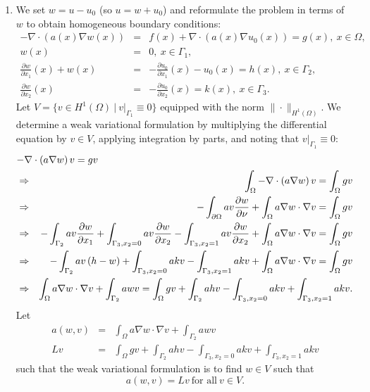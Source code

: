 \documentclass{article}
\begin{document}
\begin{enumerate}
\begin{enumerate}
\item We set \(w = u - u_0\) (so \(u = w + u_0\)) and reformulate the problem in terms of \(w\) to obtain homogeneous boundary conditions:
\begin{eqnarray*}
-\nabla \cdot (a(x) \nabla w(x)) & = & f(x) + \nabla \cdot (a(x) \nabla u_0(x)) = g(x), \ x \in \Omega, \\
w(x) & = & 0, \ x \in \Gamma_1, \\
\frac{\partial w}{\partial x_1}(x) + w(x) & = & -\frac{\partial u_0}{\partial x_1}(x) - u_0(x) = h(x), \ x \in \Gamma_2, \\
\frac{\partial w}{\partial x_2}(x) & = & -\frac{\partial u_0}{\partial x_2}(x) = k(x), \ x \in \Gamma_3.
\end{eqnarray*}
Let \(V = \{v \in H^1(\Omega) \ | \ v|_{\Gamma_1} \equiv 0\}\) equipped with the norm \(\|\cdot\|_{H^1(\Omega)}\).  We determine a weak variational formulation by multiplying the differential equation by \(v \in V\), applying integration by parts, and noting that \(v|_{\Gamma_1} \equiv 0\):
\begin{eqnarray*}
\lefteqn{-\nabla \cdot \left( a \nabla w \right) v = g v} \\
& \Rightarrow & \int_{\Omega} -\nabla \cdot \left( a \nabla w \right) v = \int_{\Omega} g v \\
& \Rightarrow & -\int_{\partial\Omega} a v \frac{\partial w}{\partial \nu} + \int_{\Omega} a \nabla w \cdot \nabla v = \int_{\Omega} g v \\
& \Rightarrow & -\int_{\Gamma_2} a v \frac{\partial w}{\partial x_1} + \int_{\Gamma_3, x_2 = 0} a v \frac{\partial w}{\partial x_2} - \int_{\Gamma_3, x_2 = 1} a v \frac{\partial w}{\partial x_2} + \int_{\Omega} a \nabla w \cdot \nabla v = \int_{\Omega} g v \\
& \Rightarrow & -\int_{\Gamma_2} a v \left( h - w \right) + \int_{\Gamma_3, x_2 = 0} a k v - \int_{\Gamma_3, x_2 = 1} a k v + \int_{\Omega} a \nabla w \cdot \nabla v = \int_{\Omega} g v \\
& \Rightarrow & \int_{\Omega} a \nabla w \cdot \nabla v + \int_{\Gamma_2} a w v = \int_{\Omega} g v + \int_{\Gamma_2} a h v - \int_{\Gamma_3, x_2 = 0} a k v + \int_{\Gamma_3, x_2 = 1} a k v.
\end{eqnarray*}
Let
\begin{eqnarray*}
a(w,v) & = & \int_{\Omega} a \nabla w \cdot \nabla v + \int_{\Gamma_2} a w v \\
Lv & = & \int_{\Omega} g v + \int_{\Gamma_2} a h v - \int_{\Gamma_3, x_2 = 0} a k v + \int_{\Gamma_3, x_2 = 1} a k v
\end{eqnarray*}
such that the weak variational formulation is to find \(w \in V\) such that
\[a(w,v) = Lv \ \text{for all} \ v \in V.\]


\end{enumerate}
\end{enumerate}
\end{document}
